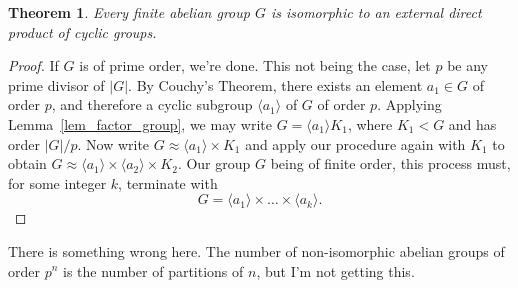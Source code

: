 \documentclass[12pt]{article}
\newtheorem{theorem}{Theorem}[section]
\begin{document}
\begin{theorem}
Every finite abelian group $G$ is isomorphic to an external direct product
of cyclic groups.
\end{theorem}
\begin{proof}
If $G$ is of prime order, we're done.  This not being the case, let $p$
be any prime divisor of $|G|$.  By Couchy's Theorem, there exists an element $a_1\in G$
of order $p$, and therefore a cyclic subgroup $\langle a_1\rangle$ of $G$ of order $p$.
Applying Lemma~\ref{lem_factor_group}, we may write
$G=\langle a_1\rangle K_1$, where $K_1<G$ and has order $|G|/p$.
Now write $G\approx\langle a_1\rangle\times K_1$ and apply our procedure
again with $K_1$ to obtain $G\approx\langle a_1\rangle\times\langle a_2\rangle\times K_2$.
Our group $G$ being of finite order, this process must, for some integer $k$, terminate with
\begin{equation*}
G=\langle a_1\rangle\times\dots\times\langle a_k\rangle.
\end{equation*}
\end{proof}

There is something wrong here.  The number of non-isomorphic abelian groups of order $p^n$
is the number of partitions of $n$, but I'm not getting this.
\end{document}
